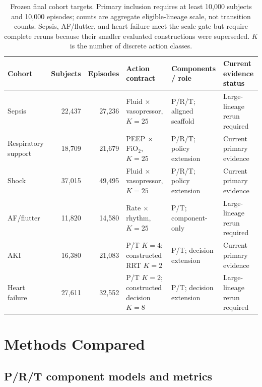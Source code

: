 \documentclass[sigconf,review]{acmart}
\begin{document}
\begin{table}[t]
\centering
\caption{Frozen final cohort targets. Primary inclusion requires at least 10,000 subjects and 10,000 episodes; counts are aggregate eligible-lineage scale, not transition counts. Sepsis, AF/flutter, and heart failure meet the scale gate but require complete reruns because their smaller evaluated constructions were superseded. $K$ is the number of discrete action classes.}
\label{tab:tasks}
\scriptsize
\begin{tabularx}{\textwidth}{lrrXXX}
\toprule
Cohort & Subjects & Episodes & Action contract & Components / role & Current evidence status \\
\midrule
Sepsis & 22,437 & 27,236 & Fluid $\times$ vasopressor, $K=25$ & P/R/T; aligned scaffold & Large-lineage rerun required \\
Respiratory support & 18,709 & 21,679 & PEEP $\times$ FiO$_2$, $K=25$ & P/R/T; policy extension & Current primary evidence \\
Shock & 37,015 & 49,495 & Fluid $\times$ vasopressor, $K=25$ & P/R/T; policy extension & Current primary evidence \\
AF/flutter & 11,820 & 14,580 & Rate $\times$ rhythm, $K=25$ & P/T; component-only & Large-lineage rerun required \\
AKI & 16,380 & 21,083 & P/T $K=4$; constructed RRT $K=2$ & P/T; decision extension & Current primary evidence \\
Heart failure & 27,611 & 32,552 & P/T $K=2$; constructed decision $K=8$ & P/T; decision extension & Large-lineage rerun required \\
\bottomrule
\end{tabularx}
\end{table}

\section{Methods Compared}

\subsection{P/R/T component models and metrics}
\end{document}
